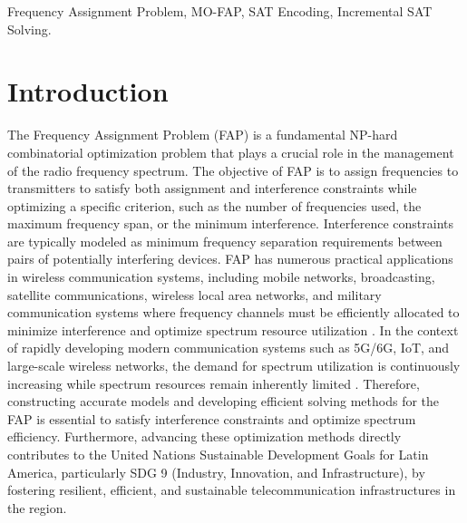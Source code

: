 \documentclass[letterpaper,journal]{IEEEtran}
\begin{document}
\begin{IEEEkeywords}
Frequency Assignment Problem, MO-FAP, SAT Encoding, Incremental SAT Solving.
\end{IEEEkeywords}

\section{Introduction}

The Frequency Assignment Problem (FAP) is a fundamental NP-hard combinatorial optimization problem \cite{murphey1999fap,Aardal2007,Mahmoudi2023} that plays a crucial role in the management of the radio frequency spectrum. The objective of FAP is to assign frequencies to transmitters to satisfy both assignment and interference constraints while optimizing a specific criterion, such as the number of frequencies used, the maximum frequency span, or the minimum interference.
Interference constraints are typically modeled as minimum frequency separation requirements between pairs of potentially interfering devices. 
FAP has numerous practical applications in wireless communication systems, including mobile networks, broadcasting, satellite communications, wireless local area networks, and military communication systems where frequency channels must be efficiently allocated to minimize interference and optimize spectrum resource utilization \cite{Aardal2007,Mahmoudi2023}. 
In the context of rapidly developing modern communication systems such as 5G/6G, IoT, and large-scale wireless networks, the demand for spectrum utilization is continuously increasing while spectrum resources remain inherently limited \cite{Mondal2024,Cuellar2024,Alhussien2024}. 
Therefore, constructing accurate models and developing efficient solving methods for the FAP is essential to satisfy interference constraints and optimize spectrum efficiency. 
Furthermore, advancing these optimization methods directly contributes to the United Nations Sustainable Development Goals for Latin America, particularly SDG 9 (Industry, Innovation, and Infrastructure), by fostering resilient, efficient, and sustainable telecommunication infrastructures in the region.
\end{document}
